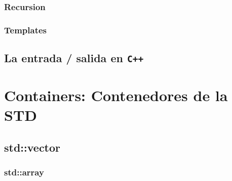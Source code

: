 \documentclass[12pt, fleqn]{report}                             %
\theoremstyle{break}                                            %
\newcommand{\textCode}[1]  { \texttt{#1} }                      %
\newcommand \Cpp  {\textCode{C++} }                               %
\begin{document}
                    \cite{shaharmikeLambdas}


            \subsection{Recursion}


            \subsection{Templates}


        \clearpage
        \section{La entrada / salida en \Cpp}

     

    \clearpage
    \chapter{Containers: Contenedores de la STD}

        \section{std::vector}

            \subsection{std::array}
\end{document}
